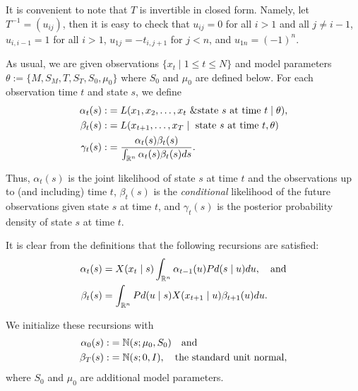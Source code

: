 \documentclass[12pt,leqno]{article}
\begin{document}
It is convenient to note that $T$ is invertible in closed form.  Namely, let $T^{-1} = (u_{ij})$, then
it is easy to check that $u_{ij} = 0$ for all $i > 1$ and all $j\neq i-1$,
$u_{i,i-1} = 1$ for all $i > 1$, $ u_{1j} = -t_{i,j+1}$ for $j < n$, and $u_{1n} = (-1)^n$.   

As usual, we are given observations $\{x_t\mid 1\le t\le N\}$ and model parameters $\theta := \{M,S_M,T,S_T,S_0,\mu_0\}$
where $S_0$ and $\mu_0$ are defined below.  For each observation time $t$ and state $s$, we define
\begin{align*}
  \alpha_t(s) :&= L(x_1,x_2,\dots,x_t~ \& \text{state $s$ at time $t$}\mid \theta ),\\
  \beta_t(s) :&= L(x_{t+1},\dots,x_T \mid ~\text{state $s$ at time $t$},\theta)\\
  \gamma_t(s) :&= \frac{\alpha_t(s)\beta_t(s)}{\int_{{\mathbb R}^n}\alpha_t(s)\beta_t(s)ds}.
\end{align*}

Thus, $\alpha_t(s)$ is the joint likelihood of state $s$ at time $t$ and the observations up to (and including) time $t$,
$\beta_t(s)$ is the {\em conditional} likelihood of the future observations given state $s$ at time $t$, and $\gamma_t(s)$
is the posterior probability density of state $s$ at time $t$.

It is clear from the definitions that the following recursions are satisfied:
\begin{align}
\alpha_t(s) &= X(x_t \mid s)\int_{{\mathbb R}^n}\alpha_{t-1}(u)Pd(s \mid u)du,\quad\text{and}\label{alpha:0}\\
\beta_t(s) &= \int_{{\mathbb R}^{n}}Pd(u \mid s)X(x_{t+1} \mid u)\beta_{t+1}(u)du.\label{beta:0}
\end{align}

We initialize these recursions with
\begin{align*}
\alpha_0(s) :&= {\mathbb N}(s;\mu_0,S_0)\quad\text{and} \\
\beta_{T}(s) :&= {\mathbb N}(s;0,I), \quad\text{the standard unit normal},
\end{align*}
where $S_0$ and $\mu_0$ are additional model parameters.
\end{document}
